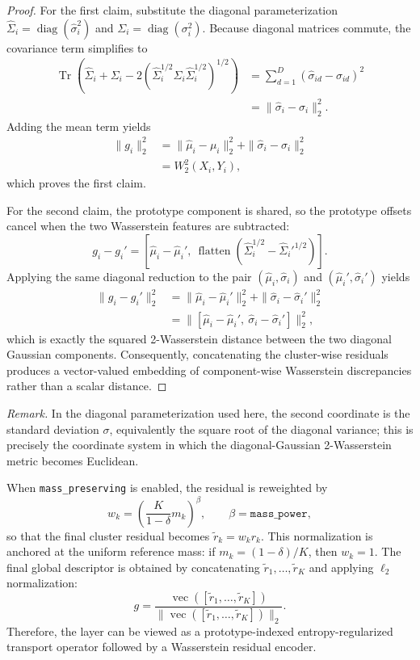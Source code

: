 \documentclass[journal]{IEEEtran}
\DeclareMathOperator{\flatten}{flatten}
\begin{document}
\begin{proof}
For the first claim, substitute the diagonal parameterization \(\hat{\Sigma}_i = \operatorname{diag}(\hat{\sigma}_i^2)\) and \(\Sigma_i = \operatorname{diag}(\sigma_i^2)\). Because diagonal matrices commute, the covariance term simplifies to
\begin{align}
\operatorname{Tr}\!\left(\hat{\Sigma}_i + \Sigma_i - 2\left(\hat{\Sigma}_i^{1/2}\Sigma_i\hat{\Sigma}_i^{1/2}\right)^{1/2}\right)
&= \sum_{d=1}^D (\hat{\sigma}_{id}-\sigma_{id})^2 \nonumber\\
&= \|\hat{\sigma}_i-\sigma_i\|_2^2.
\end{align}
Adding the mean term yields
\begin{align}
\|g_i\|_2^2
&= \|\hat{\mu}_i-\mu_i\|_2^2 + \|\hat{\sigma}_i-\sigma_i\|_2^2 \nonumber\\
&= W_2^2(X_i,Y_i),
\end{align}
which proves the first claim.

For the second claim, the prototype component is shared, so the prototype offsets cancel when the two Wasserstein features are subtracted:
\[
g_i - g_i' = [\hat{\mu}_i-\hat{\mu}_i',\ \flatten(\hat{\Sigma}_i^{1/2}-\hat{\Sigma}_i'^{1/2})].
\]
Applying the same diagonal reduction to the pair \((\hat{\mu}_i,\hat{\sigma}_i)\) and \((\hat{\mu}_i',\hat{\sigma}_i')\) yields
\begin{align}
\|g_i-g_i'\|_2^2
&= \|\hat{\mu}_i-\hat{\mu}_i'\|_2^2 + \|\hat{\sigma}_i-\hat{\sigma}_i'\|_2^2 \nonumber\\
&= \|[\hat{\mu}_i-\hat{\mu}_i',\ \hat{\sigma}_i-\hat{\sigma}_i']\|_2^2,
\end{align}
which is exactly the squared 2-Wasserstein distance between the two diagonal Gaussian components. Consequently, concatenating the cluster-wise residuals produces a vector-valued embedding of component-wise Wasserstein discrepancies rather than a scalar distance.
\end{proof}

\noindent\textit{Remark.} In the diagonal parameterization used here, the second coordinate is the standard deviation \(\sigma\), equivalently the square root of the diagonal variance; this is precisely the coordinate system in which the diagonal-Gaussian 2-Wasserstein metric becomes Euclidean.

When \texttt{mass\_preserving} is enabled, the residual is reweighted by
\[
w_k = \left(\frac{K}{1-\delta}m_k\right)^\beta,\qquad \beta = \texttt{mass\_power},
\]
so that the final cluster residual becomes \(\tilde{r}_k = w_k r_k\). This normalization is anchored at the uniform reference mass: if \(m_k = (1-\delta)/K\), then \(w_k = 1\). The final global descriptor is obtained by concatenating \(\tilde{r}_1,\ldots,\tilde{r}_K\) and applying \(\ell_2\) normalization:
\[
g = \frac{\operatorname{vec}([\tilde{r}_1,\ldots,\tilde{r}_K])}{\|\operatorname{vec}([\tilde{r}_1,\ldots,\tilde{r}_K])\|_2}.
\]
Therefore, the layer can be viewed as a prototype-indexed entropy-regularized transport operator followed by a Wasserstein residual encoder.
\end{document}
